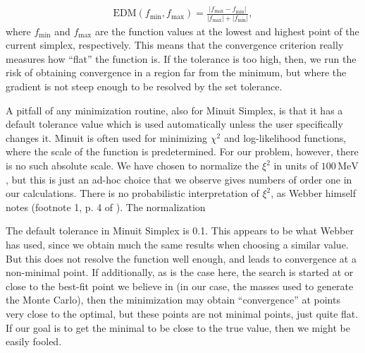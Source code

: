 \documentclass[twoside,english]{uiofysmaster}
\begin{document}
\begin{align}
	\mathrm{EDM}(f_\mathrm{min},f_\mathrm{max}) = \frac{|f_\mathrm{max}-f_\mathrm{min}|}{|f_\mathrm{max}| + |f_\mathrm{min}|},
\end{align}
where $f_\mathrm{min}$ and $f_\mathrm{max}$ are the function values at the lowest and highest point of the current simplex, respectively. This means that the convergence criterion really measures how ``flat'' the function is. If the tolerance is too high, then, we run the risk of obtaining convergence in a region far from the minimum, but where the gradient is not steep enough to be resolved by the set tolerance.

A pitfall of any minimization routine, also for Minuit Simplex, is that it has a default tolerance value which is used automatically unless the user specifically changes it. Minuit is often used for minimizing $\chi^2$ and log-likelihood functions, where the scale of the function is predetermined. For our problem, however, there is no such absolute scale. We have chosen to normalize the $\xi^2$ in units of $100 \, \mathrm{MeV}$, but this is just an ad-hoc choice that we observe gives numbers of order one in our calculations. There is no probabilistic interpretation of $\xi^2$, as Webber himself notes (footnote 1, p. 4 of \cite{Webber:2009vm}). The normalization 

The default tolerance in Minuit Simplex is 0.1. This appears to be what Webber has used, since we obtain much the same results when choosing a similar value. But this does not resolve the function well enough, and leads to convergence at a non-minimal point. If additionally, as is the case here, the search is started at or close to the best-fit point we believe in (in our case, the masses used to generate the Monte Carlo), then the minimization may obtain ``convergence'' at points very close to the optimal, but these points are not minimal points, just quite flat. If our goal is to get the minimal to be close to the true value, then we might be easily fooled.

\end{document}
